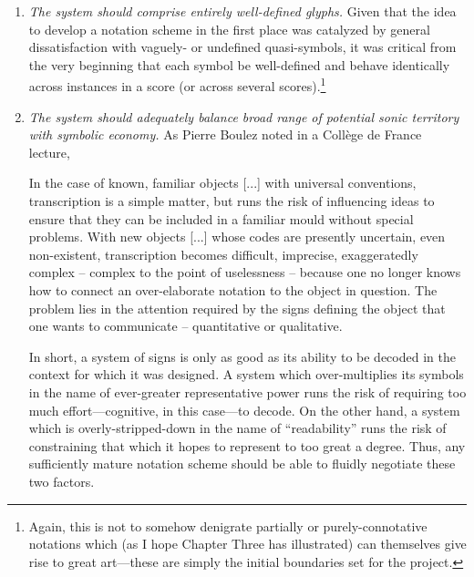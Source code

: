     \begin{enumerate}[label=(\roman*)]
        \item \textit{The system should comprise entirely well-defined glyphs.} Given that the idea to develop a notation scheme in the first place was catalyzed by general dissatisfaction with vaguely- or undefined quasi-symbols, it was critical from the very beginning that each symbol be well-defined and behave identically across instances in a score (or across several scores).\footnote{Again, this is not to somehow denigrate partially or purely-connotative notations which (as I hope Chapter Three has illustrated) can themselves give rise to great art---these are simply the initial boundaries set for the project.}

        \item \textit{The system should adequately balance broad range of potential sonic
        territory with symbolic economy.}   As Pierre Boulez noted in a Coll\`{e}ge de France lecture, 

        \begin{smallquote}
            In the case of known, familiar objects [...] with universal conventions, transcription is a simple matter, but runs the risk of influencing ideas to ensure that they can be included in a familiar mould without special problems. With new objects [...] whose codes are presently uncertain, even non-existent, transcription becomes difficult, imprecise, exaggeratedly complex – complex to the point of uselessness – because one no longer knows how to connect an over-elaborate notation to the object in question. The problem lies in the attention required by the signs defining the object that one wants to communicate – quantitative or qualitative.\autocite[532]{Boulez_Nattiez_2019}
        \end{smallquote}

        \noindent In short, a system of signs is only as good as its ability to be decoded in the context for which it was designed. A system which over-multiplies its symbols in the name of ever-greater representative power runs the risk of requiring too much effort---cognitive, in this case---to decode. On the other hand, a system which is overly-stripped-down in the name of ``readability'' runs the risk of constraining that which it hopes to represent to too great a degree. Thus, any sufficiently mature notation scheme should be able to fluidly negotiate these two factors.


\end{enumerate}
